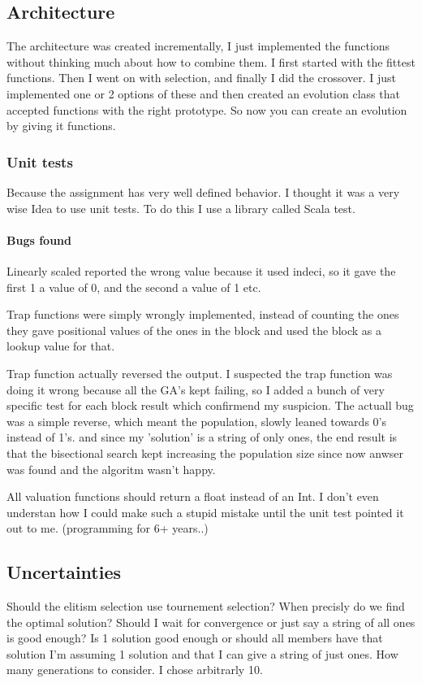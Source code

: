 \documentclass{article}
\begin{document}
\subsection{Architecture}
The architecture was created incrementally, I just implemented the functions
without thinking much about how to combine them.  I first started with the
fittest functions. Then I went on with selection, and finally I did the
crossover.
I just implemented one or 2 options of these and then created an evolution
class that accepted functions with the right prototype. So now you can
create an evolution by giving it functions.

\subsubsection{Unit tests}
Because the assignment has very well defined behavior. I thought it was
a very wise Idea to use unit tests. To do this I use a library called
Scala test.

\paragraph{Bugs found}
Linearly scaled reported the wrong value because it used indeci, so it
gave the first 1 a value of 0, and the second a value of 1 etc.

Trap functions were simply wrongly implemented, instead of counting the
ones they gave positional values of the ones in the block and used the
block as a lookup value for that.

Trap function actually reversed the output. I suspected the trap function
was doing it wrong because all the GA's kept failing, so I added a bunch
of very specific test for each block result which confirmend my suspicion.
The actuall bug was a simple reverse, which meant  the population, slowly
leaned towards 0's instead of 1's. and since my 'solution' is a string
of only ones, the end result is that the bisectional search kept increasing
the population size since now anwser was found and the algoritm wasn't happy.

All valuation functions should return a float instead of an Int.
I don't even understan how I could make such a stupid mistake until the
unit test pointed it out to me. (programming for 6+ years..)

\subsection{Uncertainties}
Should the elitism selection use tournement selection?
When precisly do we find the optimal solution?
	Should I wait for convergence or just say a string
	of all ones is good enough?
	Is 1 solution good enough or should all members have
	that solution
	I'm assuming 1 solution and that I can give a string
	of just ones.
How many generations to consider. I chose arbitrarly 10.
\end{document}
